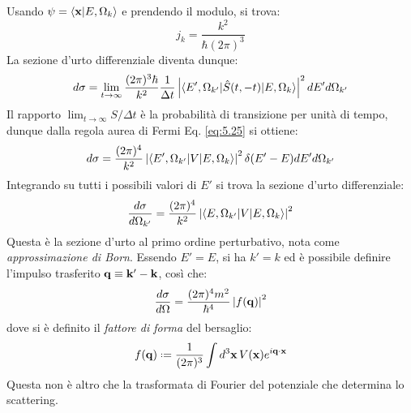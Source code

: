 Usando $ \psi = \braket{\mathbf{x} | E, \Omega_k} $ e prendendo il modulo, si trova:
\begin{equation}
	j_k = \frac{k^2}{\hbar (2\pi)^3}
	\label{eq:5.30}
\end{equation}
La sezione d'urto differenziale diventa dunque:
\begin{equation*}
	d \sigma = \lim_{t \rightarrow \infty} \frac{(2\pi)^3 \hbar}{k^2} \frac{1}{\Delta t} \left\lvert\braket{E', \Omega_{k'} | \hat{S}(t,-t) | E, \Omega_k}\right\rvert^2 dE' d \Omega_{k'}
\end{equation*}
Il rapporto $ \lim_{t \rightarrow \infty} S / \Delta t $ è la probabilità di transizione per unità di tempo, dunque dalla regola aurea di Fermi Eq. \ref{eq:5.25} si ottiene:
\begin{equation*}
	d \sigma = \frac{(2\pi)^4}{k^2} \left\lvert\braket{E', \Omega_{k'} | V | E, \Omega_k}\right\rvert^2 \delta(E' - E) dE' d \Omega_{k'}
\end{equation*}
Integrando su tutti i possibili valori di $ E' $ si trova la sezione d'urto differenziale:
\begin{equation*}
	\frac{d \sigma}{d \Omega_{k'}} = \frac{(2\pi)^4}{k^2} \left\lvert\braket{E, \Omega_{k'} | V | E, \Omega_k}\right\rvert^2
\end{equation*}
Questa è la sezione d'urto al primo ordine perturbativo, nota come \textit{approssimazione di Born}. Essendo $ E' = E $, si ha $ k' = k $ ed è possibile definire l'impulso trasferito $ \mathbf{q} \equiv \mathbf{k}' - \mathbf{k} $, così che:
\begin{equation}
	\frac{d \sigma}{d \Omega} = \frac{(2\pi)^4 m^2}{\hbar^4} \left\lvert f(\mathbf{q})\right\rvert^2
	\label{eq:5.31}
\end{equation}
dove si è definito il \textit{fattore di forma} del bersaglio:
\begin{equation}
	f(\ve{q}) \defeq \frac{1}{(2\pi)^3} \int d^3 \ve{x}\, V(\ve{x}) e^{i \ve{q} \cdot \ve{x}}
	\label{eq:5.32}
\end{equation}
Questa non è altro che la trasformata di Fourier del potenziale che determina lo scattering.

